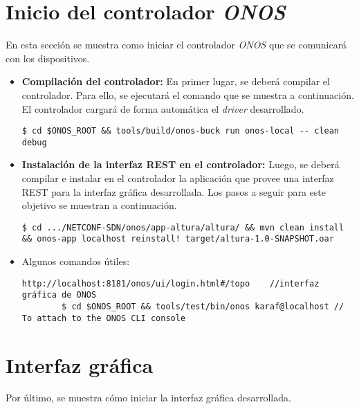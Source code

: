 \section{Inicio del controlador \textit{ONOS}}

En esta sección se muestra como iniciar el controlador \textit{ONOS} que se comunicará con los dispositivos.

\begin{itemize}   
    \item \textbf{Compilación del controlador:} En primer lugar, se deberá compilar el controlador. Para ello, se ejecutará el comando que se muestra a continuación. El controlador cargará de forma automática el \textit{driver} desarrollado. 
	
	\begin{lstlisting}[language=SHELXL]
		$ cd $ONOS_ROOT && tools/build/onos-buck run onos-local -- clean debug
	\end{lstlisting}
	
	\item \textbf{Instalación de la interfaz REST en el controlador:} Luego, se deberá compilar e instalar en el controlador la aplicación que provee una interfaz REST para la interfaz gráfica desarrollada. Los pasos a seguir para este objetivo se muestran a continuación. 
	
	\begin{lstlisting}[language=SHELXL]
		$ cd .../NETCONF-SDN/onos/app-altura/altura/ && mvn clean install && onos-app localhost reinstall! target/altura-1.0-SNAPSHOT.oar
	\end{lstlisting}

	\item Algunos comandos útiles:
	\begin{lstlisting}[language=SHELXL]
		http://localhost:8181/onos/ui/login.html#/topo    //interfaz gráfica de ONOS
		$ cd $ONOS_ROOT && tools/test/bin/onos karaf@localhost // To attach to the ONOS CLI console
	\end{lstlisting}
	
\end{itemize}


\section{Interfaz gráfica}

Por último, se muestra cómo iniciar la interfaz gráfica desarrollada.


